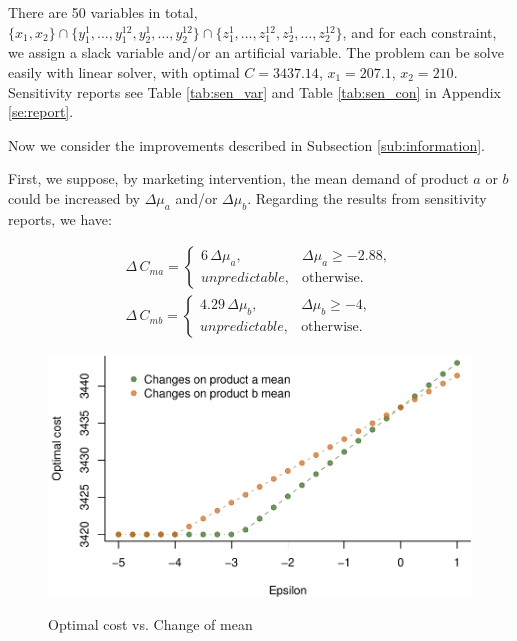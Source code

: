 \documentclass[a4paper,11pt]{article}
\begin{document}
There are 50 variables in total, $\big\{ x_1,x_2 \big\} \cap \big\{ y_1^1,\dots,y_1^{12},y_2^1,\dots,y_2^{12} \big\} \cap \big\{ z_1^1,\dots,z_1^{12},z_2^1,\dots,z_2^{12} \big\}$, and for each constraint, we assign a slack variable and/or an artificial variable. The problem can be solve easily with linear solver, with optimal $C=3437.14$, $x_1=207.1$, $x_2=210$. Sensitivity reports see Table \ref{tab:sen_var} and Table \ref{tab:sen_con} in Appendix \ref{se:report}.

Now we consider the improvements described in Subsection \ref{sub:information}.

First, we suppose, by marketing intervention, the mean demand of product $a$ or $b$ could be increased by $\Delta \mu_a$ and/or $\Delta \mu_b$. Regarding the results from sensitivity reports, we have:

\[
\begin{aligned}
    \Delta \, C_{ma} = 
    \begin{cases}
        6 \, \Delta \mu_a, & \Delta \mu_a \geq -2.88,\\
        unpredictable, & \text{otherwise}.
    \end{cases}\\
    \Delta \, C_{mb} = 
    \begin{cases}
        4.29 \, \Delta \mu_b, & \Delta \mu_b \geq -4,\\
        unpredictable, & \text{otherwise}.
    \end{cases}
\end{aligned}
\]

\begin{figure}[htb]
\centering
\caption{Optimal cost vs. Change of mean}
\includegraphics{Example-figure_files/figure-latex/mean-1.pdf}
\label{fig:mean}
\end{figure}
\end{document}
